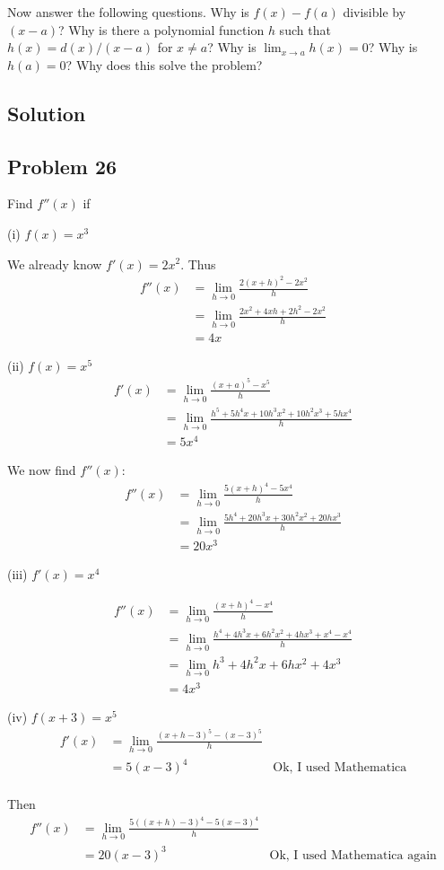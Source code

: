 Now answer the following questions. Why is $f(x)-f(a)$ divisible by
$(x-a)$? Why is there a polynomial function $h$ such that
$h(x)=d(x)/(x-a)$ for $x\neq a$? Why is $\lim_{x\to a}h(x)=0$? Why is
$h(a)=0$? Why does this solve the problem?

\subsection*{Solution}

\subsection*{Problem 26}
Find $f''(x)$ if

\vs

(i) $f(x)=x^3$

We already know $f'(x)=2x^2$. Thus
\begin{align*}
  f''(x)&=\lim_{h\to0}\frac{2(x+h)^2-2x^2}{h}\\
        &=\lim_{h\to0}\frac{2x^2+4xh+2h^2-2x^2}{h}\\
        &=4x
\end{align*}

\vs

(ii) $f(x)=x^5$
\begin{align*}
  f'(x)&=\lim_{h\to0}\frac{(x+a)^5-x^5}{h}\\
       &=\lim_{h\to0}\frac{h^5 + 5 h^4 x + 10 h^3 x^2 + 10 h^2 x^3 + 5
  h x^4}{h}\\
       &=5x^4
\end{align*}

We now find $f''(x)$:
\begin{align*}
  f''(x)&=\lim_{h\to0}\frac{5(x+h)^4-5x^4}{h}\\
        &=\lim_{h\to0}\frac{5 h^4 + 20 h^3 x + 30 h^2 x^2 + 20 h
          x^3}{h}\\
        &=20x^3
\end{align*}

\vs

(iii) $f'(x)=x^4$

\begin{align*}
  f''(x)&=\lim_{h\to0}\frac{(x+h)^4-x^4}{h}\\
        &=\lim_{h\to0}\frac{h^4+4h^3x+6h^2x^2+4hx^3+x^4-x^4}{h}\\
        &=\lim_{h\to0}h^3+4h^2x+6hx^2+4x^3\\
        &=4x^3
\end{align*}

\vs

(iv) $f(x+3)=x^5$
\begin{align*}
  f'(x)&=\lim_{h\to0}\frac{(x+h-3)^5-(x-3)^5}{h}\\
       &=5(x-3)^4&\text{Ok, I used Mathematica}\\
\end{align*}

Then
\begin{align*}
  f''(x)&=\lim_{h\to0}\frac{5((x+h)-3)^4-5(x-3)^4}{h}\\
        &=20(x-3)^3&\text{Ok, I used Mathematica again}
\end{align*}


